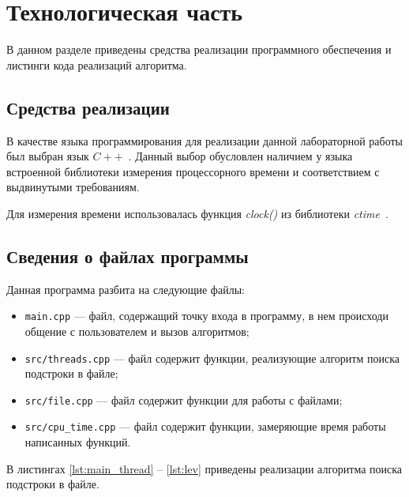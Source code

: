 \chapter{Технологическая часть}

В данном разделе приведены средства реализации программного обеспечения и листинги кода реализаций алгоритма.

\section{Средства реализации}

В качестве языка программирования для реализации данной лабораторной работы был выбран язык $C++$~\cite{cpp-lang}.
Данный выбор обусловлен наличием у языка встроенной библиотеки измерения процессорного времени и соответствием с выдвинутыми требованиям.

Для измерения времени использовалась функция \textit{clock()} из библиотеки \textit{ctime}~\cite{cpp-lang-time}.

\clearpage

\section{Сведения о файлах программы}

Данная программа разбита на следующие файлы:

\begin{itemize}[label=---]
	\item \texttt{main.cpp} --- файл, содержащий точку входа в программу, в нем происходи общение с пользователем и вызов алгоритмов;
	\item \texttt{src/threads.cpp} --- файл содержит функции, реализующие алгоритм поиска подстроки в файле;
	\item \texttt{src/file.cpp} --- файл содержит функции для работы с файлами;
	\item \texttt{src/cpu\_time.cpp} --- файл содержит функции, замеряющие время работы написанных функций.
\end{itemize}

В листингах \ref{lst:main_thread} -- \ref{lst:lev} приведены реализации алгоритма поиска подстроки в файле.

\clearpage

